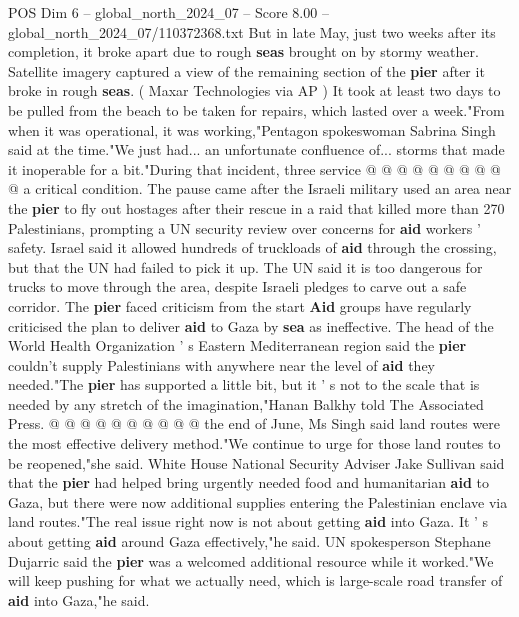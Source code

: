 \begin{textsample}{POS Dim 6 – global\_north\_2024\_07 – Score 8.00 – global\_north\_2024\_07/110372368.txt}
But in late May, just two weeks after its completion, it broke apart due to rough \textbf{seas} brought on by stormy weather.
Satellite imagery captured a view of the remaining section of the \textbf{pier} after it broke in rough \textbf{seas}. ( Maxar Technologies via AP ) It took at least two days to be pulled from the beach to be taken for repairs, which lasted over a week."From when it was operational, it was working,"Pentagon spokeswoman Sabrina Singh said at the time."We just had... an unfortunate confluence of... storms that made it inoperable for a bit."During that incident, three service @ @ @ @ @ @ @ @ @ @ a critical condition.
The pause came after the Israeli military used an area near the \textbf{pier} to fly out hostages after their rescue in a raid that killed more than 270 Palestinians, prompting a UN security review over concerns for \textbf{aid} workers ' safety.
Israel said it allowed hundreds of truckloads of \textbf{aid} through the crossing, but that the UN had failed to pick it up.
The UN said it is too dangerous for trucks to move through the area, despite Israeli pledges to carve out a safe corridor.
The \textbf{pier} faced criticism from the start \textbf{Aid} groups have regularly criticised the plan to deliver \textbf{aid} to Gaza by \textbf{sea} as ineffective.
The head of the World Health Organization ' s Eastern Mediterranean region said the \textbf{pier} couldn't supply Palestinians with anywhere near the level of \textbf{aid} they needed."The \textbf{pier} has supported a little bit, but it ' s not to the scale that is needed by any stretch of the imagination,"Hanan Balkhy told The Associated Press. @ @ @ @ @ @ @ @ @ @ the end of June, Ms Singh said land routes were the most effective delivery method."We continue to urge for those land routes to be reopened,"she said.
White House National Security Adviser Jake Sullivan said that the \textbf{pier} had helped bring urgently needed food and humanitarian \textbf{aid} to Gaza, but there were now additional supplies entering the Palestinian enclave via land routes."The real issue right now is not about getting \textbf{aid} into Gaza.
It ' s about getting \textbf{aid} around Gaza effectively,"he said.
UN spokesperson Stephane Dujarric said the \textbf{pier} was a welcomed additional resource while it worked."We will keep pushing for what we actually need, which is large-scale road transfer of \textbf{aid} into Gaza,"he said.

\end{textsample}
